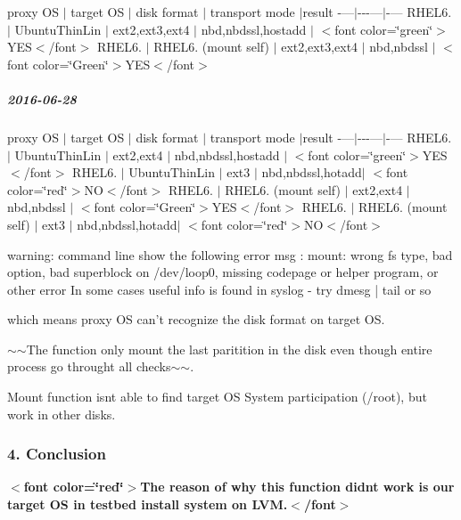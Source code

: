 proxy OS $\vert$ target OS $\vert$ disk format $\vert$ transport mode $\vert$result -\/---$\vert$-\/-\/-\/---$\vert$-\/--- R\+H\+E\+L6. $\vert$ Ubuntu\+Thin\+Lin $\vert$ ext2,ext3,ext4 $\vert$ nbd,nbdssl,hostadd $\vert$ $<$font color=\char`\"{}green\char`\"{}$>$Y\+ES$<$/font$>$ R\+H\+E\+L6. $\vert$ R\+H\+E\+L6. (mount self) $\vert$ ext2,ext3,ext4 $\vert$ nbd,nbdssl $\vert$ $<$font color=\char`\"{}\+Green\char`\"{}$>$Y\+ES$<$/font$>$

\subparagraph*{2016-\/06-\/28}

proxy OS $\vert$ target OS $\vert$ disk format $\vert$ transport mode $\vert$result -\/---$\vert$-\/-\/-\/---$\vert$-\/--- R\+H\+E\+L6. $\vert$ Ubuntu\+Thin\+Lin $\vert$ ext2,ext4 $\vert$ nbd,nbdssl,hostadd $\vert$ $<$font color=\char`\"{}green\char`\"{}$>$Y\+ES$<$/font$>$ R\+H\+E\+L6. $\vert$ Ubuntu\+Thin\+Lin $\vert$ ext3 $\vert$ nbd,nbdssl,hotadd$\vert$ $<$font color=\char`\"{}red\char`\"{}$>$NO$<$/font$>$ R\+H\+E\+L6. $\vert$ R\+H\+E\+L6. (mount self) $\vert$ ext2,ext4 $\vert$ nbd,nbdssl $\vert$ $<$font color=\char`\"{}\+Green\char`\"{}$>$Y\+ES$<$/font$>$ R\+H\+E\+L6. $\vert$ R\+H\+E\+L6. (mount self) $\vert$ ext3 $\vert$ nbd,nbdssl,hotadd$\vert$ $<$font color=\char`\"{}red\char`\"{}$>$NO$<$/font$>$ \begin{DoxyVerb}warning: command line show the following error msg :
mount: wrong fs type, bad option, bad superblock on /dev/loop0,
   missing codepage or helper program, or other error
   In some cases useful info is found in syslog - try
   dmesg | tail  or so

which means proxy OS can't recognize the disk format on target OS.
\end{DoxyVerb}



\begin{DoxyItemize}
\item $\sim$$\sim$\+The function only mount the last paritition in the disk even though entire process go throught all checks$\sim$$\sim$.
\item Mount function isn\textquotesingle{}t able to find target OS System participation (/root), but work in other disks.
\end{DoxyItemize}

\subsubsection*{4. Conclusion}


\begin{DoxyItemize}
\item {\bfseries $<$font color=\char`\"{}red\char`\"{}$>$The reason of why this function didn\textquotesingle{}t work is our target OS in testbed install system on L\+VM.$<$/font$>$}
\end{DoxyItemize}

